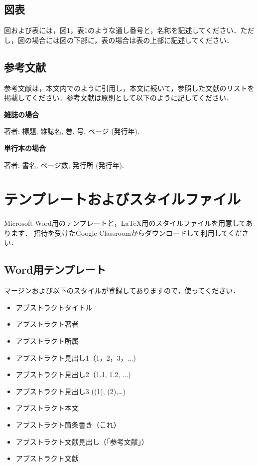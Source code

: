 \documentclass[a4paper]{jarticle}
\begin{document}
\begin{論文概要}
\subsection{図表}
図および表には，図1，表1のような通し番号と，名称を記述してください．ただし，図の場合には図の下部に，表の場合は表の上部に記述してください．

\subsection{参考文献}
参考文献は，本文内で\cite{paper1}\cite{paper2}のように引用し，本文に続いて，参照した文献のリストを掲載してください．参考文献は原則として以下のように記してください．

\begin{newenumerate}

\item {\bf 雑誌の場合}

著者: 標題, 雑誌名, 巻, 号, ページ (発行年).

\item {\bf 単行本の場合}

著者: 書名, ページ数, 発行所 (発行年).

\end{newenumerate}

\section{テンプレートおよびスタイルファイル}
Microsoft Word用のテンプレートと，\LaTeX 用のスタイルファイルを用意してあります．
招待を受けたGoogle Classroomからダウンロードして利用してください．

\subsection{Word用テンプレート}
マージンおよび以下のスタイルが登録してありますので，使ってください．
\begin{itemize}
\item アブストラクトタイトル
\item アブストラクト著者
\item アブストラクト所属
\item アブストラクト見出し1（1，2，3，...)
\item アブストラクト見出し2（1.1, 1.2, ...)
\item アブストラクト見出し3 ((1), (2),…)
\item アブストラクト本文
\item アブストラクト箇条書き（これ）
\item アブストラクト文献見出し（「参考文献」）
\item アブストラクト文献
\end{itemize}


\end{論文概要}
\end{document}
